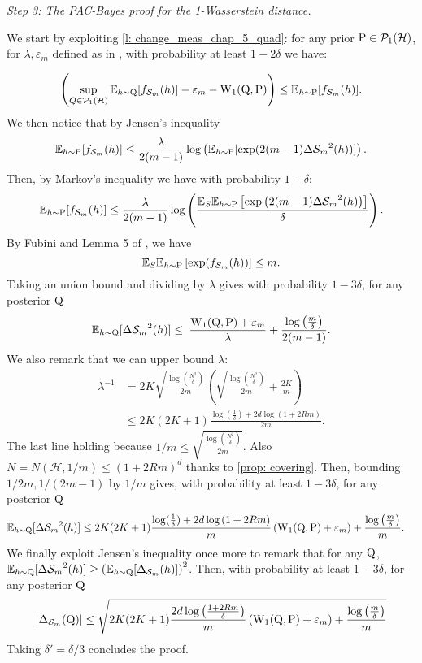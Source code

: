 \begin{noaddcontents}
\textit{Step 3: The PAC-Bayes proof for the 1-Wasserstein distance.}

We start by exploiting \cref{l: change_meas_chap_5_quad}: for any prior $\P\in\mathcal{P}_1(\mathcal{H})$, for $\lambda, \varepsilon_m$ defined as in , with probability at least $1-2\delta$ we have:

\[ \left(\sup_{Q\in \mathcal{P}_1(\mathcal{H})} \mathbb{E}_{h\sim \Q}[ f_{\Sm}(h)] - \varepsilon_m - \W_{1}(\Q,\P) \right) \leq \mathbb{E}_{h\sim \P}[ f_{\Sm}(h)]. \]
We then notice that by Jensen's inequality
$$\mathbb{E}_{h\sim \P}[ f_{\Sm}(h)] \leq \frac{\lambda}{2(m-1)}\log\left(\mathbb{E}_{h\sim \P}[ \exp(2(m-1)\Delta{\Sm}^2(h))]    \right).$$
Then, by Markov's inequality we have with probability $1-\delta$:
\[ \mathbb{E}_{h\sim \P}[ f_{\Sm}(h)] \leq \frac{\lambda}{2(m-1)} \log\left(\frac{\mathbb{E}_S\mathbb{E}_{h\sim \P}\left[ \exp\left(2(m-1)\Delta{\Sm}^2(h)\right) \right]}{\delta}\right).  \]
By Fubini and Lemma 5 of \citet{mcallester2003simplified}, we have
\[ \mathbb{E}_S\mathbb{E}_{h\sim \P}\left[ \exp(f_{\Sm}(h))\right] \leq m. \]
Taking an union bound and dividing by $\lambda$ gives with probability $1-3\delta$, for any posterior $\Q$
\[ \mathbb{E}_{h\sim \Q}[\Delta{\Sm}^2(h)] \leq \frac{}{}  \frac{\W_{1}(\Q,\P)+\varepsilon_m}{\lambda} + \frac{\log\left( \frac{m}{\delta} \right)}{2(m-1)}.   \]
We also remark that we can upper bound $\lambda$:
\begin{align*}
\lambda^{-1} & =  2K\sqrt{\frac{\log(\frac{N^2}{\delta})}{2m}}\left(\sqrt{\frac{\log(\frac{N^2}{\delta})}{2m}} + \frac{2K}{m} \right)\\
& \leq 2K(2K+1)\frac{\log(\frac{1}{\delta}) + 2d\log\left(1 +2Rm \right)}{2m}.
\end{align*}
The last line holding because $1/m \leq \sqrt{\frac{\log(\frac{N^2}{\delta})}{2m}}$. Also $N= N(\mathcal{H},1/m) \leq (1+2Rm)^d$ thanks to \cref{prop: covering}.
Then, bounding $1/2m, 1/(2m-1)$ by $1/m$ gives, with probability at least $1-3\delta$, for any posterior $\Q$
\begin{align*}
\mathbb{E}_{h\sim \Q}[\Delta{\Sm}^2(h)] & \leq  2K(2K+1) \frac{\log(\frac{1}{\delta}) + 2d\log\left(1 +2Rm \right)}{m} \left(\W_{1}(\Q,\P)+\varepsilon_m \right) + \frac{\log\left( \frac{m}{\delta} \right)}{m}.
\end{align*}
We finally exploit Jensen's inequality once more to remark that for any $\Q$, $\mathbb{E}_{h\sim \Q}[\Delta{\Sm}^2(h)] \geq \left(\mathbb{E}_{h\sim \Q}[\Delta_{\Sm}(h)]  \right)^2$.
Then, with probability at least $1-3\delta$, for any posterior $\Q$
\[ |\Delta_{\Sm}(\Q)| \leq \sqrt{2K(2K+1)\frac{2d\log\left(\frac{1 +2Rm }{\delta}\right)}{m} \left(\W_{1}(\Q,\P)+\varepsilon_m \right) + \frac{\log\left( \frac{m}{\delta} \right)}{m}   } \]
Taking $\delta'= \delta/3$ concludes the proof.


\end{noaddcontents}
